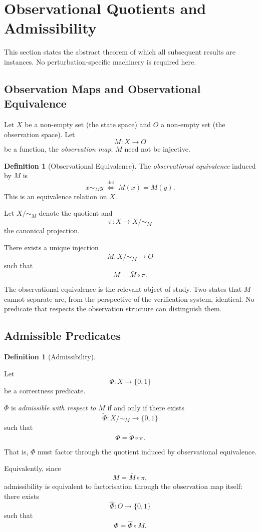 \documentclass[pdflatex,sn-mathphys-num]{sn-jnl}
\theoremstyle{plain}
\theoremstyle{definition}
\newtheorem{definition}[theorem]{Definition}
\theoremstyle{remark}
\begin{document}
\section{Observational Quotients and Admissibility}
\label{sec:quotients}

This section states the abstract theorem of which all subsequent
results are instances.
No perturbation-specific machinery is required here.

\subsection{Observation Maps and Observational Equivalence}

Let $X$ be a non-empty set (the state space) and $O$ a non-empty set
(the observation space).
Let
\[
M : X \to O
\]
be a function, the \emph{observation map}; $M$ need not be injective.

\begin{definition}[Observational Equivalence]
The \emph{observational equivalence} induced by $M$ is
\[
x \sim_M y
\;\stackrel{\mathrm{def}}{\iff}\;
M(x) = M(y).
\]
This is an equivalence relation on $X$.

Let $X/{\sim_M}$ denote the quotient and
\[
\pi : X \to X/{\sim_M}
\]
the canonical projection.

There exists a unique injection
\[
\bar{M} : X/{\sim_M} \to O
\]
such that
\[
M = \bar{M} \circ \pi.
\]
\end{definition}

The observational equivalence is the relevant object of study.
Two states that $M$ cannot separate are, from the perspective of the
verification system, identical.
No predicate that respects the observation structure can distinguish
them.

\subsection{Admissible Predicates}

\begin{definition}[Admissibility]
\label{def:admissibility}

Let
\[
\Phi : X \to \{0,1\}
\]
be a correctness predicate.

$\Phi$ is \emph{admissible with respect to $M$} if and only if there
exists
\[
\widetilde{\Phi} : X/{\sim_M} \to \{0,1\}
\]
such that
\[
\Phi = \widetilde{\Phi} \circ \pi.
\]

That is, $\Phi$ must factor through the quotient induced by
observational equivalence.

Equivalently, since
\[
M = \bar{M} \circ \pi,
\]
admissibility is equivalent to factorisation through the observation
map itself: there exists
\[
\hat{\Phi} : O \to \{0,1\}
\]
such that
\[
\Phi = \hat{\Phi} \circ M.
\]
\end{definition}
\end{document}
